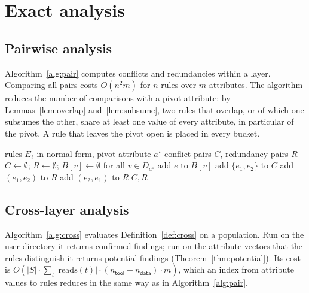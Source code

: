 \documentclass[preprint,12pt]{elsarticle}
\theoremstyle{definition}
\theoremstyle{remark}
\newcommand{\reads}{\mathrm{reads}}
\begin{document}
\section{Exact analysis}\label{sec:algorithms}

\subsection{Pairwise analysis}
Algorithm~\ref{alg:pair} computes conflicts and redundancies within a layer. Comparing all pairs costs $O(n^2 m)$ for $n$ rules over $m$ attributes. The algorithm reduces the number of comparisons with a pivot attribute: by Lemmas~\ref{lem:overlap} and~\ref{lem:subsume}, two rules that overlap, or of which one subsumes the other, share at least one value of every attribute, in particular of the pivot. A rule that leaves the pivot open is placed in every bucket.

\begin{algorithm}[t]
\caption{Pairwise analysis of one layer}\label{alg:pair}
\begin{algorithmic}[1]
\Require rules $E_\ell$ in normal form, pivot attribute $a^\star$
\Ensure conflict pairs $C$, redundancy pairs $R$
\State $C \gets \emptyset$; $R \gets \emptyset$; $B[v] \gets \emptyset$ for all $v \in D_{a^\star}$
   \State add $e$ to $B[v]$ \EndFor
\EndFor
{}
     \State add $\{e_1, e_2\}$ to $C$ \EndIf
  \EndIf
     \State add $(e_1, e_2)$ to $R$
     \State add $(e_2, e_1)$ to $R$ \EndIf
  \EndIf
\EndFor
\State \Return $C, R$
\end{algorithmic}
\end{algorithm}

\subsection{Cross-layer analysis}
Algorithm~\ref{alg:cross} evaluates Definition~\ref{def:cross} on a population. Run on the user directory it returns confirmed findings; run on the attribute vectors that the rules distinguish it returns potential findings (Theorem~\ref{thm:potential}). Its cost is $O(|S| \cdot \sum_t |\reads(t)| \cdot (n_{\mathsf{tool}} + n_{\mathsf{data}}) \cdot m)$, which an index from attribute values to rules reduces in the same way as in Algorithm~\ref{alg:pair}.
\end{document}
